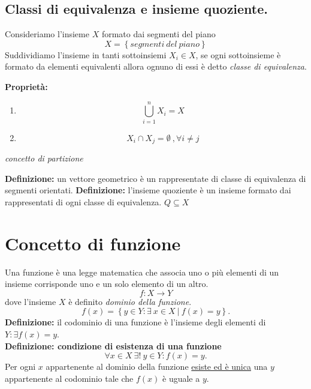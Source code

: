 \documentclass[a4paper]{article}
\newcommand{\n}{\par \noindent \newline}
\begin{document}
\subsection{Classi di equivalenza e insieme quoziente.}
Consideriamo l'insieme $X$ formato dai segmenti del piano
\begin{equation*}
	X= \left\lbrace segmenti \ del \ piano \right\rbrace 
\end{equation*}
Suddividiamo l'insieme in tanti sottoinsiemi $X_i \in X$, se ogni sottoinsieme è formato da elementi equivalenti allora ognuno di essi è detto \textit{classe di equivalenza}.
\n
\textbf{Proprietà: }

\begin{enumerate}
	\item
	\begin{equation*}
		\bigcup_{i=1}^n X_i = X
	\end{equation*}
	
	\item
	\begin{equation*}
		X_i \cap X_j = \emptyset \ , \forall i \neq j
	\end{equation*}
\end{enumerate}
\begin{flushright}
	\textit{concetto di partizione}
\end{flushright}
\noindent
\textbf{Definizione: }un vettore geometrico è un rappresentate di classe di equivalenza di segmenti orientati.
\textbf{Definizione: }l'insieme quoziente è un insieme formato dai rappresentati di ogni classe di equivalenza. $Q \subseteq X$
\section[Analisi I: Funzioni]{Concetto di funzione}
Una funzione è una legge matematica che associa uno o più elementi di un insieme corrisponde uno e un solo elemento di un altro.
\begin{equation*}
	f : X\rightarrow Y
\end{equation*}
dove l'insieme $X$ è definito \textit{dominio della funzione}.
\begin{equation*}
	f(x)=\left\lbrace y\in Y : \exists \ x \in X \ | \ f(x)=y \right\rbrace .
\end{equation*}
\textbf{Definizione: }il codominio di una funzione è l'insieme degli elementi di $Y:\exists f(x)=y$.\\
\textbf{Definizione: condizione di esistenza di una funzione}
\begin{equation*}
	\forall x\in X \ \exists ! \ y\in Y : f(x) = y.
\end{equation*}
Per ogni $x$ appartenente al dominio della funzione \underline{esiste ed è unica} una $y$ appartenente al codominio tale che $f(x)$ è uguale a $y$.
\end{document}
